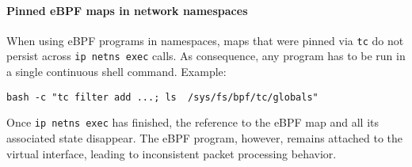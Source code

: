 \paragraph{Pinned eBPF maps in network namespaces}
When using eBPF programs in namespaces, maps that were pinned via \texttt{tc} 
do not persist across \texttt{ip netns exec} calls. As consequence, any 
program has to be run in a single continuous shell command. Example:
{\scriptsize
	\begin{verbatim}
bash -c "tc filter add ...; ls  /sys/fs/bpf/tc/globals"
	\end{verbatim}
}
Once \texttt{ip netns exec} has finished, the reference to the eBPF 
map and all its associated state disappear. The eBPF program, however, remains 
attached to the virtual interface, leading to inconsistent packet processing 
behavior.
